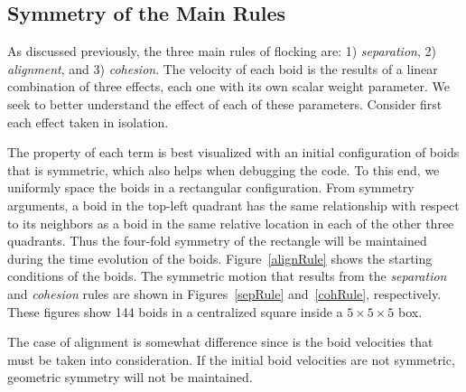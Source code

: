 \subsection{Symmetry of the Main Rules}
As discussed previously, the three main rules of flocking are: 1) \textit{separation}, 2) \textit{alignment}, and 3) \textit{cohesion}. The velocity of each boid is the results of a linear combination of three effects, each one with its own scalar weight parameter. We seek to better understand the effect of each of these parameters. Consider first each effect taken in isolation.

The property of each term is best visualized with an initial configuration of boids that is symmetric, which also helps when debugging the code. To this end, we uniformly space the boids in a rectangular configuration.  From symmetry arguments, a boid in the top-left quadrant has the same relationship with respect to its neighbors as a boid in the same relative location in each of the other three quadrants. Thus the four-fold symmetry of the rectangle will be maintained during the time evolution of the boids. Figure~\ref{alignRule} shows the starting conditions of the boids. The symmetric motion that results from the \textit{separation} and \textit{cohesion} rules are shown in Figures~\ref{sepRule} and~\ref{cohRule}, respectively. These figures show 144 boids in a centralized square inside a $5\times 5\times 5$ box.

The case of alignment is somewhat difference since is the boid velocities that must be taken into consideration. If the initial boid velocities are not symmetric, geometric symmetry will not be maintained. 

